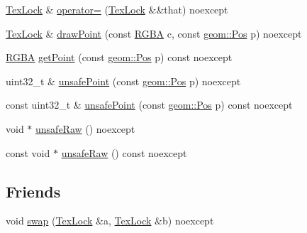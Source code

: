 \begin{DoxyCompactItemize}
\item 
\mbox{\hyperlink{classrolmodl_1_1texture_type_1_1_tex_lock}{Tex\+Lock}} \& \mbox{\hyperlink{classrolmodl_1_1texture_type_1_1_tex_lock_a84430af3fab2950111629ee4b467d126}{operator=}} (\mbox{\hyperlink{classrolmodl_1_1texture_type_1_1_tex_lock}{Tex\+Lock}} \&\&that) noexcept
\item 
\mbox{\hyperlink{classrolmodl_1_1texture_type_1_1_tex_lock}{Tex\+Lock}} \& \mbox{\hyperlink{classrolmodl_1_1texture_type_1_1_tex_lock_ac4c9045b05cd2e86d25a67cd3099f0ca}{draw\+Point}} (const \mbox{\hyperlink{structrolmodl_1_1_r_g_b_a}{R\+G\+BA}} c, const \mbox{\hyperlink{structrolmodl_1_1geom_1_1_pos}{geom\+::\+Pos}} p) noexcept
\item 
\mbox{\hyperlink{structrolmodl_1_1_r_g_b_a}{R\+G\+BA}} \mbox{\hyperlink{classrolmodl_1_1texture_type_1_1_tex_lock_a3579670215e3f10127a5dc2db9e224a1}{get\+Point}} (const \mbox{\hyperlink{structrolmodl_1_1geom_1_1_pos}{geom\+::\+Pos}} p) const noexcept
\item 
uint32\+\_\+t \& \mbox{\hyperlink{classrolmodl_1_1texture_type_1_1_tex_lock_a28b00403e956a3a4560b3d6beaf7d971}{unsafe\+Point}} (const \mbox{\hyperlink{structrolmodl_1_1geom_1_1_pos}{geom\+::\+Pos}} p) noexcept
\item 
const uint32\+\_\+t \& \mbox{\hyperlink{classrolmodl_1_1texture_type_1_1_tex_lock_a0248a56ac58b195fb4fb8203a0990221}{unsafe\+Point}} (const \mbox{\hyperlink{structrolmodl_1_1geom_1_1_pos}{geom\+::\+Pos}} p) const noexcept
\item 
void $\ast$ \mbox{\hyperlink{classrolmodl_1_1texture_type_1_1_tex_lock_af172ee118dd2acc3087497ded755cc92}{unsafe\+Raw}} () noexcept
\item 
const void $\ast$ \mbox{\hyperlink{classrolmodl_1_1texture_type_1_1_tex_lock_ae8d93bdb8d1e9fcc1c9b5a4021b094d7}{unsafe\+Raw}} () const noexcept
\end{DoxyCompactItemize}
\subsection*{Friends}
\begin{DoxyCompactItemize}
\item 
void \mbox{\hyperlink{classrolmodl_1_1texture_type_1_1_tex_lock_a2af614d0b11caac9b2138c36bc96cd38}{swap}} (\mbox{\hyperlink{classrolmodl_1_1texture_type_1_1_tex_lock}{Tex\+Lock}} \&a, \mbox{\hyperlink{classrolmodl_1_1texture_type_1_1_tex_lock}{Tex\+Lock}} \&b) noexcept
\end{DoxyCompactItemize}


